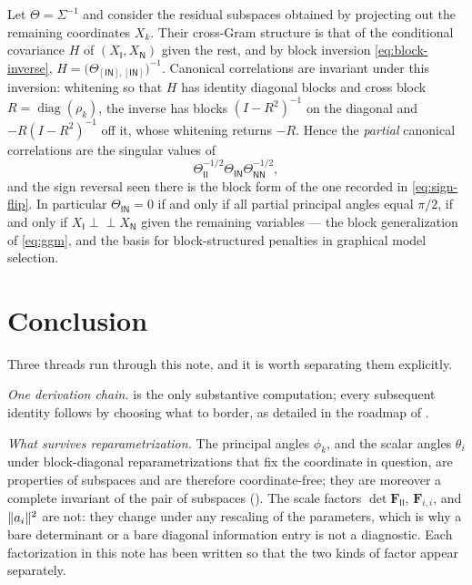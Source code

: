 \documentclass{IEEEtran}
\begin{document}
\begin{corollary}\label{cor:block-independence}
  Let $\Theta = \Sigma^{-1}$ and consider the residual subspaces obtained by projecting out the remaining coordinates $X_k$. Their cross-Gram structure is that of the conditional covariance $H$ of $(X_{\mathsf{I}},X_{\mathsf{N}})$ given the rest, and by block inversion \eqref{eq:block-inverse}, $H = \bigl(\Theta_{[\mathsf{IN}],[\mathsf{IN}]}\bigr)^{-1}$. Canonical correlations are invariant under this inversion: whitening so that $H$ has identity diagonal blocks and cross block $R = \operatorname{diag}(\rho_{k})$, the inverse has blocks $(I-R^{2})^{-1}$ on the diagonal and $-R(I-R^{2})^{-1}$ off it, whose whitening returns $-R$. Hence the \emph{partial} canonical correlations are the singular values of
  \begin{equation}
    \Theta_{\mathsf{II}}^{-1/2}\Theta_{\mathsf{IN}}\Theta_{\mathsf{NN}}^{-1/2} ,
    \label{eq:partial-canonical}
  \end{equation}
  and the sign reversal seen there is the block form of the one recorded in \eqref{eq:sign-flip}. In particular $\Theta_{\mathsf{IN}}=0$ if and only if all partial principal angles equal $\pi/2$, if and only if $X_{\mathsf{I}} \perp\!\!\!\perp X_{\mathsf{N}}$ given the remaining variables --- the block generalization of \eqref{eq:ggm}, and the basis for block-structured penalties in graphical model selection.
\end{corollary}

\section{Conclusion}
\label{sec:conclusion}

Three threads run through this note, and it is worth separating them explicitly.

\emph{One derivation chain.}  is the only substantive computation; every subsequent identity follows by choosing what to border, as detailed in the roadmap of .

\emph{What survives reparametrization.} The principal angles $\phi_{k}$, and the scalar angles $\theta_{i}$ under block-diagonal reparametrizations that fix the coordinate in question, are properties of subspaces and are therefore coordinate-free; they are moreover a complete invariant of the pair of subspaces (). The scale factors $\det\mathbf{F}_{\mathsf{II}}$, $\mathbf{F}_{i,i}$, and $\lVert a_{i}\rVert^{2}$ are not: they change under any rescaling of the parameters, which is why a bare determinant or a bare diagonal information entry is not a diagnostic. Each factorization in this note has been written so that the two kinds of factor appear separately.
\end{document}
